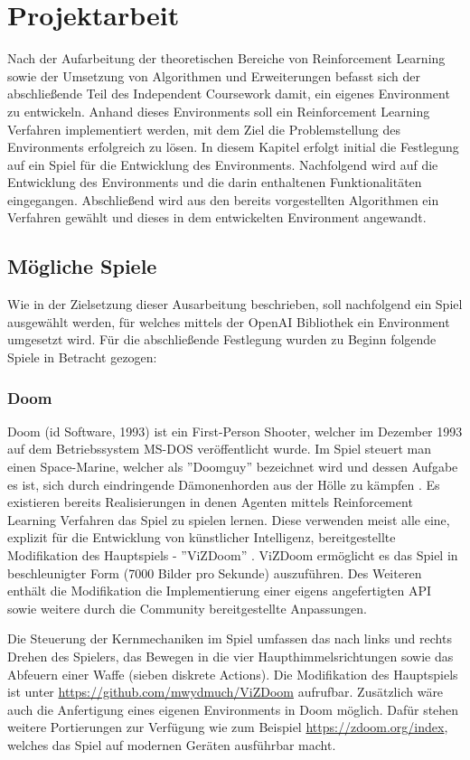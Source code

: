 \documentclass[11pt]{scrartcl}
\begin{document}
\newpage
\section{Projektarbeit}
Nach der Aufarbeitung der theoretischen Bereiche von Reinforcement Learning sowie der Umsetzung von
Algorithmen und Erweiterungen befasst sich der abschließende Teil des Independent Coursework damit,
ein eigenes Environment zu entwickeln. Anhand dieses Environments soll ein Reinforcement Learning
Verfahren implementiert werden, mit dem Ziel die Problemstellung des Environments erfolgreich zu 
lösen. In diesem Kapitel erfolgt initial die Festlegung auf ein Spiel für die Entwicklung des
Environments. Nachfolgend wird auf die Entwicklung des Environments und die darin enthaltenen
Funktionalitäten eingegangen. Abschließend wird aus den bereits vorgestellten Algorithmen ein
Verfahren gewählt und dieses in dem entwickelten Environment angewandt. 

\subsection{Mögliche Spiele}
Wie in der Zielsetzung dieser Ausarbeitung beschrieben, soll nachfolgend ein Spiel ausgewählt werden,
für welches mittels der OpenAI Bibliothek ein Environment umgesetzt wird. Für die abschließende
Festlegung wurden zu Beginn folgende Spiele in Betracht gezogen:

\subsubsection{Doom}
Doom (id Software, 1993) ist ein First-Person Shooter, welcher im Dezember 1993 auf dem Betriebssystem
MS-DOS veröffentlicht wurde. Im Spiel steuert man einen Space-Marine, welcher als ''Doomguy'' bezeichnet
wird und dessen Aufgabe es ist, sich durch eindringende Dämonenhorden aus der Hölle zu kämpfen
\cite{D1993}. Es existieren bereits Realisierungen in denen Agenten mittels Reinforcement Learning
Verfahren das Spiel zu spielen lernen. Diese verwenden meist alle eine, explizit für die Entwicklung
von künstlicher Intelligenz, bereitgestellte Modifikation des Hauptspiels - ''ViZDoom'' \cite{ViZDoom}. 
ViZDoom ermöglicht es das Spiel in beschleunigter Form (7000 Bilder pro Sekunde) auszuführen. Des
Weiteren enthält die Modifikation die Implementierung einer eigens angefertigten API sowie weitere
durch die Community bereitgestellte Anpassungen.

Die Steuerung der Kernmechaniken im Spiel umfassen das nach links und rechts Drehen des Spielers,
das Bewegen in die vier Haupthimmelsrichtungen sowie das Abfeuern einer Waffe (sieben diskrete
Actions). Die Modifikation des Hauptspiels ist unter \url{https://github.com/mwydmuch/ViZDoom}
aufrufbar. Zusätzlich wäre auch die Anfertigung eines eigenen Environments in Doom möglich. Dafür
stehen weitere Portierungen zur Verfügung wie zum Beispiel \url{https://zdoom.org/index}, welches
das Spiel auf modernen Geräten ausführbar macht. 
\end{document}
